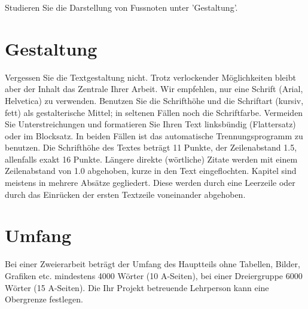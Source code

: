 Studieren Sie die Darstellung von Fussnoten unter 'Gestaltung'.

\section{Gestaltung}
Vergessen Sie die Textgestaltung nicht. Trotz verlockender Möglichkeiten bleibt aber der Inhalt das Zentrale Ihrer Arbeit.
Wir empfehlen, nur eine Schrift (Arial, Helvetica) zu verwenden. Benutzen Sie die Schrifthöhe und die Schriftart (kursiv, fett) als gestalterische Mittel; in seltenen Fällen noch die Schriftfarbe. Vermeiden Sie Unterstreichungen und formatieren Sie Ihren Text linksbündig (Flattersatz) oder im Blocksatz. In beiden Fällen ist das automatische Trennungsprogramm zu benutzen. Die Schrifthöhe des Textes beträgt 11 Punkte, der Zeilenabstand 1.5, allenfalls exakt 16 Punkte. Längere direkte (wörtliche) Zitate werden mit einem Zeilenabstand von 1.0 abgehoben, kurze in den Text eingeflochten.
Kapitel sind meistens in mehrere Absätze gegliedert. Diese werden durch eine Leerzeile oder durch das Einrücken der ersten Textzeile voneinander abgehoben.

\section{Umfang}
Bei einer Zweierarbeit beträgt der Umfang des Hauptteils ohne Tabellen, Bilder, Grafiken etc. mindestens 4000 Wörter (10 A-Seiten), bei einer Dreiergruppe 6000 Wörter (15 A-Seiten). Die Ihr Projekt betreuende Lehrperson kann eine Obergrenze festlegen.
 
 